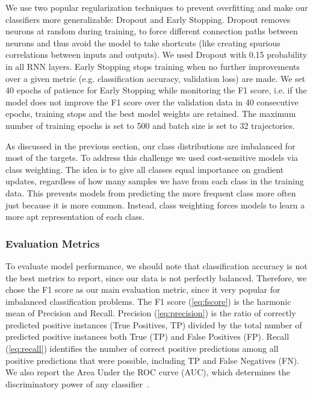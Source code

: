 \documentclass[sn-mathphys, pdflatex]{sn-jnl}
\begin{document}
We use two popular regularization techniques to prevent overfitting and make our classifiers more generalizable: Dropout and Early Stopping.
Dropout removes neurons at random during training,
to force different connection paths between neurons
and thus avoid the model to take shortcuts (like creating spurious correlations between inputs and outputs).
We used Dropout with 0.15 probability in all RNN layers.
Early Stopping stops training when no further improvements over a given metric (e.g. classification accuracy, validation loss) are made.
We set 40 epochs of patience for Early Stopping while monitoring the F1 score,
i.e. if the model does not improve the F1 score over the validation data in 40 consecutive epochs,
training stops and the best model weights are retained.
The maximum number of training epochs is set to 500 and batch size is set to 32 trajectories.

As discussed in the previous section, our class distributions are imbalanced for most of the targets.
To address this challenge we used cost-sensitive models via class weighting.
The idea is to give all classes equal importance on gradient updates,
regardless of how many samples we have from each class in the training data.
This prevents models from predicting the more frequent class more often just because it is more common.
Instead, class weighting forces models to learn a more apt representation of each class.

\subsubsection{Evaluation Metrics}

To evaluate model performance,
we should note that classification accuracy is not the best metrics to report,
since our data is not perfectly balanced.
Therefore, we chose the F1 score as our main evaluation metric,
since it very popular for imbalanced classification problems.
The F1 score (\autoref{eq:fscore}) is the harmonic mean of Precision and Recall.
Precision (\autoref{eq:precision}) is the ratio of correctly predicted positive instances (True Positives, TP)
divided by the total number of predicted positive instances both True (TP) and False Positives (FP).
Recall (\autoref{eq:recall}) identifies the number of correct positive predictions
among all positive predictions that were possible, including TP and False Negatives (FN).
We also report the Area Under the ROC curve (AUC),
which determines the discriminatory power of any classifier~\cite{Powers11}.
\end{document}
